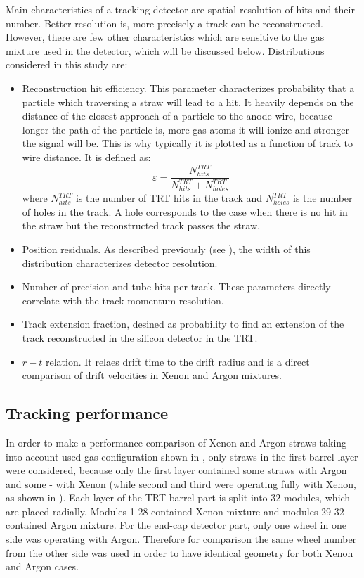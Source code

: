 Main characteristics of a tracking detector are spatial resolution of hits and their number. 
Better resolution is, more precisely a track can be reconstructed.
However, there are few other characteristics which are sensitive to the gas mixture used in the detector, which will be discussed below.
Distributions considered in this study are:
\begin{itemize}
 \item Reconstruction hit efficiency. This parameter characterizes probability that a particle which traversing a straw will lead to a hit.
 It heavily depends on the distance of the closest approach of a particle to the anode wire, because longer the path of the particle is, more gas atoms it will
 ionize and stronger the signal will be. This is why typically it is plotted as a function of track to wire distance. It is defined as:
 \begin{equation}
  \varepsilon = \dfrac{N^{TRT}_{hits}}{N^{TRT}_{hits} + N^{TRT}_{holes}}
 \label{eq:hit_eff}
 \end{equation}
 where $N^{TRT}_{hits}$ is the number of TRT hits in the track and $N^{TRT}_{holes}$ is the number of holes in the track. A hole corresponds to the case when there is no hit in the straw
 but the reconstructed track passes the straw.
 \item Position residuals. As described previously (see ), the width of this distribution characterizes detector resolution.
 \item Number of precision and tube hits per track. These parameters directly correlate with the track momentum resolution.
 \item Track extension fraction, desined as probability to find an extension of the track reconstructed in the silicon detector in the TRT.
 \item $r-t$ relation. It relaes drift time to the drift radius and is a direct comparison of drift velocities in Xenon and Argon mixtures.
\end{itemize}


\subsection{Tracking performance}
\label{subsec:TRT:trackPerf}

In order to make a performance comparison of Xenon and Argon straws taking into account used gas configuration shown in ,
only straws in the first barrel layer were considered, because only the first layer contained some straws with Argon and some - with Xenon 
(while second and third were operating fully with Xenon, as shown in ).
Each layer of the TRT barrel part is split into 32 modules, which are placed radially. 
Modules 1-28 contained Xenon mixture and modules 29-32 contained Argon mixture.
For the end-cap detector part, only one wheel in one side was operating with Argon. Therefore for comparison the same wheel number from the other side was used in order
to have identical geometry for both Xenon and Argon cases.


